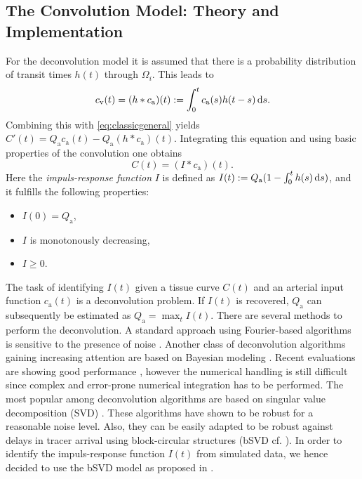 \documentclass[paper=a4, fontsize=11pt,parskip=half,headings=small]{scrartcl}
\newcommand{\ca}{c_\mathrm{a}}
\newcommand{\cout}{c_{\mathrm{v}}}
\newcommand{\Pa}{Q_{\mathrm{a}}}
\begin{document}
	\subsection{The Convolution Model: Theory and Implementation}\label{sec:conv}
	
	For the deconvolution model it is assumed that there is a probability distribution of transit times $h(t)$ through $\Omega_i$. 
	This leads to
	\begin{equation}
		\cout(t) = (h*\ca)(t) := \int_0^t \ca(s) h(t-s) \diffint s.
	\end{equation}
	Combining this with \eqref{eq:classicgeneral} yields $C'(t) = \Pa\ca(t)-\Pa (h*\ca)(t)$.
	Integrating this equation and using basic properties of the convolution one obtains
	\begin{equation}
		C(t) = (I*\ca)(t).
		\label{eq:conv}
	\end{equation}
	Here the \emph{impuls-response function} $I$ is defined as $I(t) := \Pa(1-\int_0^t h(s) \diffint s)$, and it fulfills the following properties:
	\begin{itemize}
		\item $I(0) = \Pa$,
		\item $I$ is monotonously decreasing,
		\item $I\ge 0$.		
	\end{itemize}
	The task of identifying $I(t)$ given a tissue curve $C(t)$ and an arterial input function $\ca(t)$ is a deconvolution problem.
	If $I(t)$ is recovered, $\Pa$ can subsequently be estimated as $\Pa = \max_{t} I(t)$.
	There are several methods to perform the deconvolution.
	A standard approach using Fourier-based algorithms is sensitive to the presence of noise \cite{ostergaard96,wirestam00}.
	Another class of deconvolution algorithms gaining increasing attention are based on Bayesian modeling \cite{boutelier12,mouridsen06}.
	Recent evaluations are showing good performance \cite{sasaki13}, however the numerical handling is still difficult since complex and error-prone numerical integration has to be performed.
	The most popular among deconvolution algorithms are based on singular value decomposition (SVD) \cite{ostergaard96}.
	These algorithms have shown to be robust for a reasonable noise level.
	Also, they can be easily adapted to be robust against delays in tracer arrival using block-circular structures (bSVD cf. \cite{wu03}).
	In order to identify the impuls-response function $I(t)$ from simulated data, we hence decided to use the bSVD model as proposed in \cite{wu03}.
\end{document}
